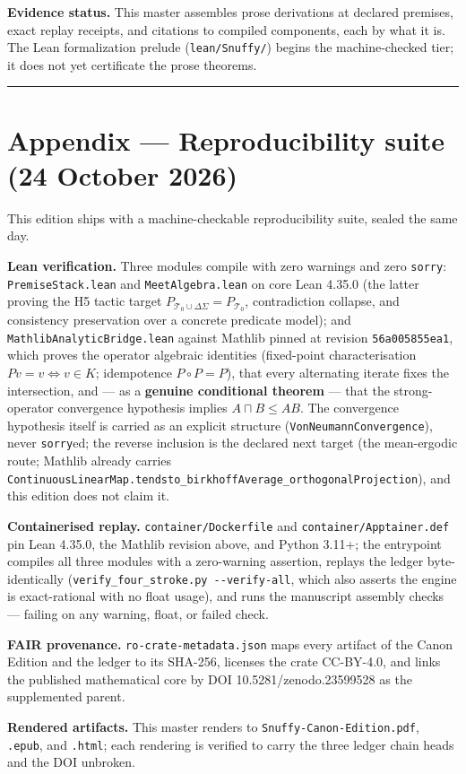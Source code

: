 \documentclass[
]{article}
\begin{document}
\textbf{Evidence status.} This master assembles prose derivations at
declared premises, exact replay receipts, and citations to compiled
components, each by what it is. The Lean formalization prelude
(\texttt{lean/Snuffy/}) begins the machine-checked tier; it does not yet
certificate the prose theorems.

\begin{center}\rule{0.5\linewidth}{0.5pt}\end{center}

\section{Appendix --- Reproducibility suite (24 October
2026)}\label{appendix-reproducibility-suite-24-october-2026}

This edition ships with a machine-checkable reproducibility suite,
sealed the same day.

\textbf{Lean verification.} Three modules compile with zero warnings and
zero \texttt{sorry}: \texttt{PremiseStack.lean} and
\texttt{MeetAlgebra.lean} on core Lean 4.35.0 (the latter proving the H5
tactic target \(P_{\mathcal T_0\cup\Delta\Sigma}=P_{\mathcal T_0}\),
contradiction collapse, and consistency preservation over a concrete
predicate model); and \texttt{MathlibAnalyticBridge.lean} against
Mathlib pinned at revision \texttt{56a005855ea1}, which proves the
operator algebraic identities (fixed-point characterisation
\(Pv=v\iff v\in K\); idempotence \(P\circ P=P\)), that every alternating
iterate fixes the intersection, and --- as a \textbf{genuine conditional
theorem} --- that the strong-operator convergence hypothesis implies
\(A\sqcap B\le AB\). The convergence hypothesis itself is carried as an
explicit structure (\texttt{VonNeumannConvergence}), never
\texttt{sorry}ed; the reverse inclusion is the declared next target (the
mean-ergodic route; Mathlib already carries
\texttt{ContinuousLinearMap.tendsto\_birkhoffAverage\_orthogonalProjection}),
and this edition does not claim it.

\textbf{Containerised replay.} \texttt{container/Dockerfile} and
\texttt{container/Apptainer.def} pin Lean 4.35.0, the Mathlib revision
above, and Python 3.11+; the entrypoint compiles all three modules with
a zero-warning assertion, replays the ledger byte-identically
(\texttt{verify\_four\_stroke.py\ -\/-verify-all}, which also asserts
the engine is exact-rational with no float usage), and runs the
manuscript assembly checks --- failing on any warning, float, or failed
check.

\textbf{FAIR provenance.} \texttt{ro-crate-metadata.json} maps every
artifact of the Canon Edition and the ledger to its SHA-256, licenses
the crate CC-BY-4.0, and links the published mathematical core by DOI
10.5281/zenodo.23599528 as the supplemented parent.

\textbf{Rendered artifacts.} This master renders to
\texttt{Snuffy-Canon-Edition.pdf}, \texttt{.epub}, and \texttt{.html};
each rendering is verified to carry the three ledger chain heads and the
DOI unbroken.
\end{document}

